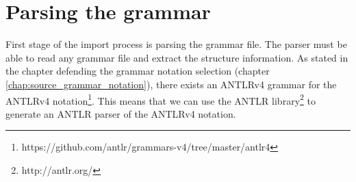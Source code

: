 \section{Parsing the grammar}

First stage of the import process is parsing the grammar file. The parser must be able to read any grammar file and extract the structure information. As stated in the chapter defending the grammar notation selection (chapter  \ref{chap:source_grammar_notation}), there exists an ANTLRv4 grammar for the ANTLRv4 notation\footnote{https://github.com/antlr/grammars-v4/tree/master/antlr4}. This means that we can use the ANTLR library\footnote{http://antlr.org/} to generate an ANTLR parser of the ANTLRv4 notation. 
